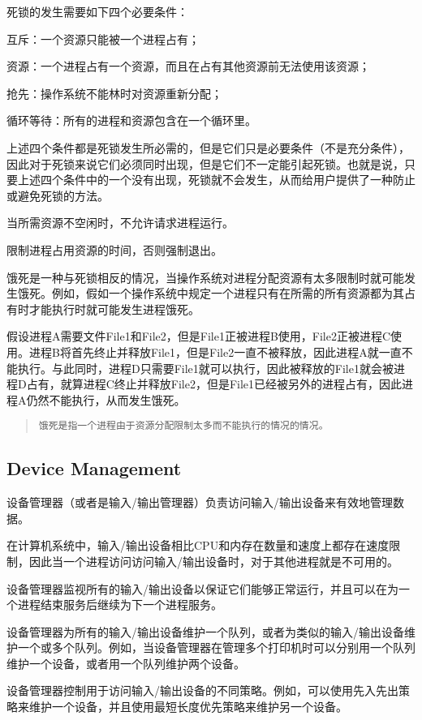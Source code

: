 死锁的发生需要如下四个必要条件：

\begin{compactenum}
\item 互斥：一个资源只能被一个进程占有；
\item 资源：一个进程占有一个资源，而且在占有其他资源前无法使用该资源；
\item 抢先：操作系统不能林时对资源重新分配；
\item 循环等待：所有的进程和资源包含在一个循环里。
\end{compactenum}

上述四个条件都是死锁发生所必需的，但是它们只是必要条件（不是充分条件），因此对于死锁来说它们必须同时出现，但是它们不一定能引起死锁。也就是说，只要上述四个条件中的一个没有出现，死锁就不会发生，从而给用户提供了一种防止或避免死锁的方法。


\begin{compactitem}
\item 当所需资源不空闲时，不允许请求进程运行。
\item 限制进程占用资源的时间，否则强制退出。
\end{compactitem}

饿死是一种与死锁相反的情况，当操作系统对进程分配资源有太多限制时就可能发生饿死。例如，假如一个操作系统中规定一个进程只有在所需的所有资源都为其占有时才能执行时就可能发生进程饿死。

假设进程A需要文件File1和File2，但是File1正被进程B使用，File2正被进程C使用。进程B将首先终止并释放File1，但是File2一直不被释放，因此进程A就一直不能执行。与此同时，进程D只需要File1就可以执行，因此被释放的File1就会被进程D占有，就算进程C终止并释放File2，但是File1已经被另外的进程占有，因此进程A仍然不能执行，从而发生饿死。

\begin{quote}
\texttt{饿死是指一个进程由于资源分配限制太多而不能执行的情况的情况。}
\end{quote}

\subsection{Device Management}

设备管理器（或者是输入/输出管理器）负责访问输入/输出设备来有效地管理数据。

在计算机系统中，输入/输出设备相比CPU和内存在数量和速度上都存在速度限制，因此当一个进程访问访问输入/输出设备时，对于其他进程就是不可用的。

\begin{compactitem}
\item 设备管理器监视所有的输入/输出设备以保证它们能够正常运行，并且可以在为一个进程结束服务后继续为下一个进程服务。
\item 设备管理器为所有的输入/输出设备维护一个队列，或者为类似的输入/输出设备维护一个或多个队列。例如，当设备管理器在管理多个打印机时可以分别用一个队列维护一个设备，或者用一个队列维护两个设备。
\item 设备管理器控制用于访问输入/输出设备的不同策略。例如，可以使用先入先出策略来维护一个设备，并且使用最短长度优先策略来维护另一个设备。
\end{compactitem}

